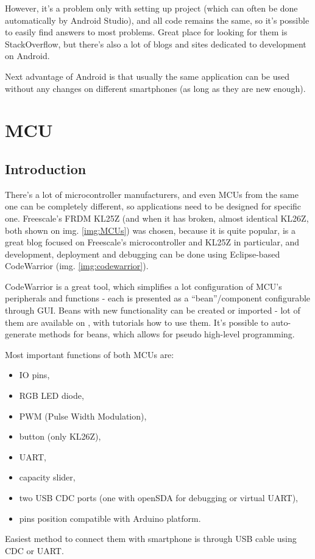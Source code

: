 However, it's a problem only with setting up project (which can often be done
automatically by Android Studio), and all code remains the same, so it's
possible to easily find answers to most problems.
Great place for looking for them is StackOverflow, but there's also a lot of
blogs and sites dedicated to development on Android.

Next advantage of Android is that usually the same application can be used
without any changes on different smartphones (as long as they are new enough).

\clearpage

\section{MCU}
\subsection{Introduction}
There's a lot of microcontroller manufacturers, and even MCUs from the same one
can be completely different, so applications need to be designed for specific
one.
Freescale's FRDM KL25Z (and when it has broken, almost identical KL26Z, both
shown on img. \ref{img:MCUs}) was chosen, because it is quite popular,
\cite{mcu_on_eclipse} is a great blog focused on Freescale's microcontroller and KL25Z in particular, and development, deployment and debugging can be done using
Eclipse-based CodeWarrior (img. \ref{img:codewarrior}).

CodeWarrior is a great tool, which simplifies a lot configuration of MCU's
peripherals and functions - each is presented as a ``bean''/component
configurable through GUI.
Beans with new functionality can be created or imported - lot of them are
available on \cite{mcu_on_eclipse}, with tutorials how to use them.
It's possible to auto-generate methods for beans, which allows for pseudo
high-level programming.

Most important functions of both MCUs are:
\begin{itemize}
  \item IO pins,
  \item RGB LED diode,
  \item PWM (Pulse Width Modulation),
  \item button (only KL26Z),
  \item UART,
  \item capacity slider,
  \item two USB CDC ports (one with openSDA for debugging or virtual UART),
  \item pins position compatible with Arduino platform.
\end{itemize}
Easiest method to connect them with smartphone is through USB cable using CDC or
UART.

